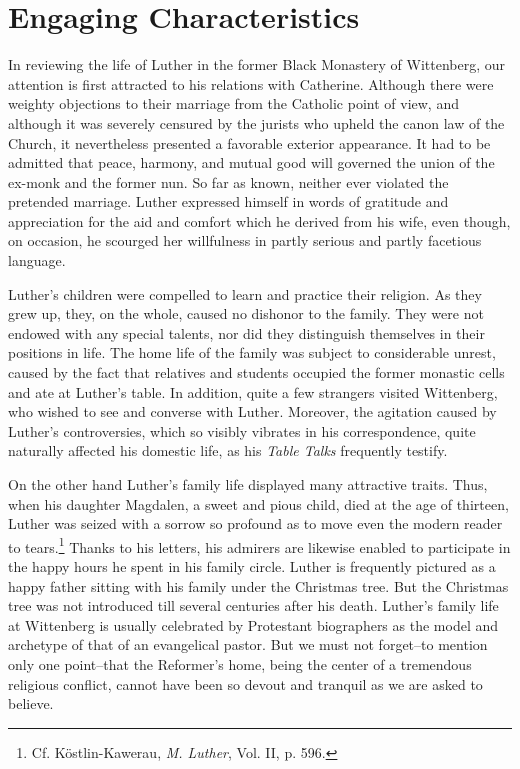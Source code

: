 \section{Engaging Characteristics}

In reviewing the life of Luther in the former Black Monastery of
Wittenberg, our attention is first attracted to his relations with Catherine.
Although there were weighty objections to their marriage from
the Catholic point of view, and although it was severely censured by
the jurists who upheld the canon law of the Church, it nevertheless
presented a favorable exterior appearance. It had to be admitted that
peace, harmony, and mutual good will governed the union of the
ex-monk and the former nun. So far as known, neither ever violated
the pretended marriage. Luther expressed himself in words of
gratitude and appreciation for the aid and comfort which he derived
from his wife, even though, on occasion, he scourged her willfulness
in partly serious and partly facetious language.

Luther’s children were compelled to learn and practice their religion.
As they grew up, they, on the whole, caused no dishonor to the
family. They were not endowed with any special talents, nor did
they distinguish themselves in their positions in life.
The home life of the family was subject to considerable unrest,
caused by the fact that relatives and students occupied the former
monastic cells and ate at Luther’s table. In addition, quite a few
strangers visited Wittenberg, who wished to see and converse with
Luther. Moreover, the agitation caused by Luther’s controversies,
which so visibly vibrates in his correspondence, quite naturally affected
his domestic life, as his \textit{Table Talks} frequently testify.

On the other hand Luther’s family life displayed many attractive
traits. Thus, when his daughter Magdalen, a sweet and pious child,
died at the age of thirteen, Luther was seized with a sorrow so profound
as to move even the modern reader to tears.\footnote{Cf. Köstlin-Kawerau, \textit{M. Luther}, Vol. II, p. 596.}
Thanks to his
letters, his admirers are likewise enabled to participate in the happy
hours he spent in his family circle. Luther is frequently pictured as
a happy father sitting with his family under the Christmas tree. But
the Christmas tree was not introduced till several centuries after his
death. Luther’s family life at Wittenberg is usually celebrated by
Protestant biographers as the model and archetype of that of an
evangelical pastor. But we must not forget--to mention only one
point--that the Reformer’s home, being the center of a tremendous
religious conflict, cannot have been so devout and tranquil as we are
asked to believe.

